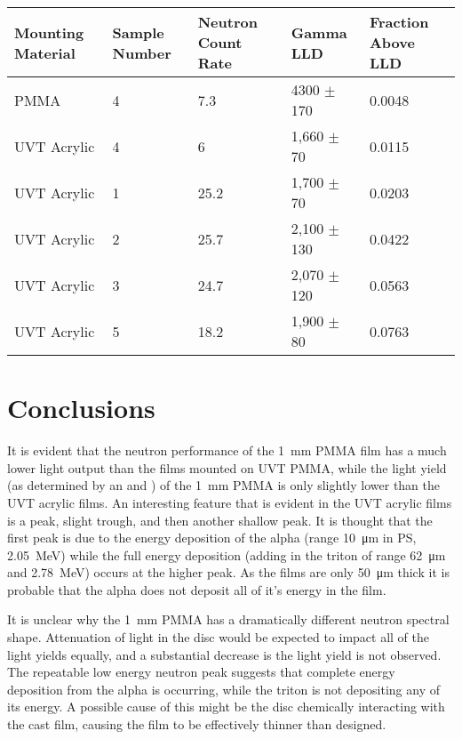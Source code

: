 \documentclass[draftcls,onecolumn]{IEEEtran}
\begin{document}
\begin{table}
  \centering
  \begin{tabular}{m{2cm} m{2cm} m{2cm} m{2cm} m{2cm}}
  \toprule
  Mounting Material	&	Sample Number	&	Neutron Count Rate	&	Gamma LLD			&	Fraction Above LLD	\\
  \midrule
  PMMA	&	4	&	7.3	&	4300	$\pm$	170	&	0.0048	\\
  UVT Acrylic	&	4	&	6	&	1,660	$\pm$	70	&	0.0115	\\
  UVT Acrylic	&	1	&	25.2	&	1,700	$\pm$	70	&	0.0203	\\
  UVT Acrylic	&	2	&	25.7	&	2,100	$\pm$	130	&	0.0422	\\
  UVT Acrylic	&	3	&	24.7	&	2,070	$\pm$	120	&	0.0563	\\
  UVT Acrylic	&	5	&	18.2	&	1,900	$\pm$	80	&	0.0763	\\
  \bottomrule
  \end{tabular}
\end{table}
\section{Conclusions}
It is evident that the neutron performance of the \SI{1}{\mm} PMMA film has a much lower light output than the films mounted on UVT PMMA, while the light yield (as determined by an  and ) of the \SI{1}{\mm} PMMA is only slightly lower than the UVT acrylic films.
An interesting feature that is evident in the UVT acrylic films is a peak, slight trough, and then another shallow peak.
It is thought that the first peak is due to the energy deposition of the alpha (range \SI{10}{\um} in PS, \SI{2.05}{\MeV}) while the full energy deposition (adding in the triton of range \SI{62}{\um} and \SI{2.78}{\MeV}) occurs at the higher peak.
As the films are only \SI{50}{\um} thick it is probable that the alpha does not deposit all of it's energy in the film.

It is unclear why the \SI{1}{\mm} PMMA has a dramatically different neutron spectral shape.
Attenuation of light in the disc would be expected to impact all of the light yields equally, and a substantial decrease is the light yield is not observed.
The repeatable low energy neutron peak suggests that complete energy deposition from the alpha is occurring, while the triton is not depositing any of its energy.
A possible cause of this might be the disc chemically interacting with the cast film, causing the film to be effectively thinner than designed.
\end{document}
